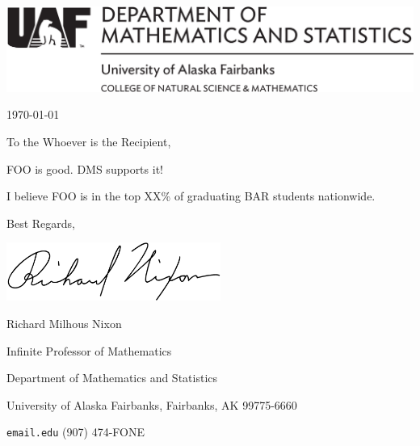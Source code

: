 \documentclass[11pt]{amsart}
\begin{document}
\noindent \includegraphics[width=5.5in]{sighorizblack}

\thispagestyle{empty}
\vspace{0.5in}

\hfill \today   %
\bigskip

\noindent To the Whoever is the Recipient,
\bigskip

\noindent FOO is good.  DMS supports it!
\medskip

\noindent I believe FOO is in the top XX\% of graduating BAR students nationwide.
\bigskip

\noindent Best Regards, 

\bigskip

\qquad\includegraphics[height=0.75in]{rmn_signature}

\noindent Richard Milhous Nixon

\small
\medskip

\noindent Infinite Professor of Mathematics

\noindent Department of Mathematics and Statistics

\noindent University of Alaska Fairbanks, Fairbanks, AK 99775-6660

\noindent \texttt{email\@@alaska.edu} \qquad \quad (907) 474-FONE
\end{document}

